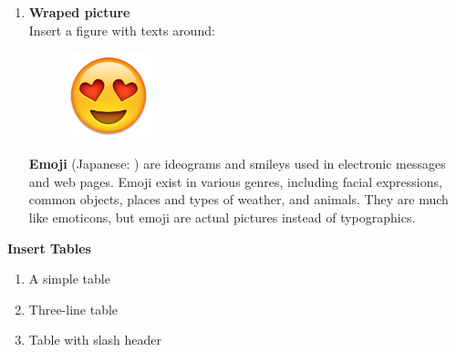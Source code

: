 \begin{solution}
\begin{enumerate}[nosep,label=(\arabic*)]
        \item \textbf{Wraped picture} \\
            Insert a figure with texts around: \\
\begin{latexample}[]
\begin{figure}
  \includegraphics[width=2.5cm]{./pic/07.png}
\end{figure}
\renewcommand{\rubysize}{0.6}
\renewcommand{\rubysep}{0.2pt}
\textbf{Emoji} (Japanese: ) are ideograms and smileys used in electronic messages and web pages. Emoji exist in various genres, including facial expressions, common objects, places and types of weather, and animals. They are much like emoticons, but emoji are actual pictures instead of typographics. 
\end{latexample}
    \end{enumerate}
\end{solution}

\begin{problem}[2]
    \textbf{Insert Tables}
    \begin{enumerate}[nosep,label=(\arabic*)]
        \item A simple table 
        \item Three-line table
        \item Table with slash header
    \end{enumerate}
\end{problem}

